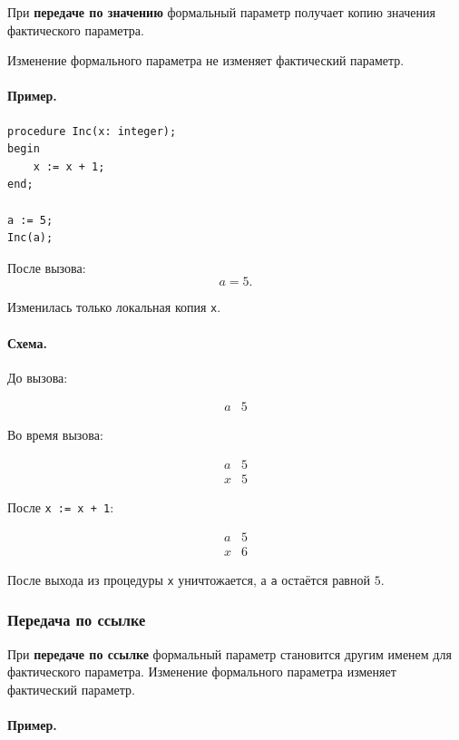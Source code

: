 \documentclass[12pt,a4paper]{article}
\begin{document}
При \textbf{передаче по значению} формальный параметр получает копию значения фактического параметра.

Изменение формального параметра не изменяет фактический параметр.

\paragraph{Пример.}

\begin{verbatim}
procedure Inc(x: integer);
begin
    x := x + 1;
end;

a := 5;
Inc(a);
\end{verbatim}

После вызова:
\[
    a = 5.
\]

Изменилась только локальная копия \texttt{x}.

\paragraph{Схема.}

До вызова:

\[
\begin{array}{c|c}
a & 5
\end{array}
\]

Во время вызова:

\[
\begin{array}{c|c}
a & 5\\
x & 5
\end{array}
\]

После \texttt{x := x + 1}:

\[
\begin{array}{c|c}
a & 5\\
x & 6
\end{array}
\]

После выхода из процедуры \texttt{x} уничтожается, а \texttt{a} остаётся равной $5$.

\subsubsection{Передача по ссылке}

При \textbf{передаче по ссылке} формальный параметр становится другим именем для фактического параметра. Изменение формального параметра изменяет фактический параметр.

\paragraph{Пример.}
\end{document}
